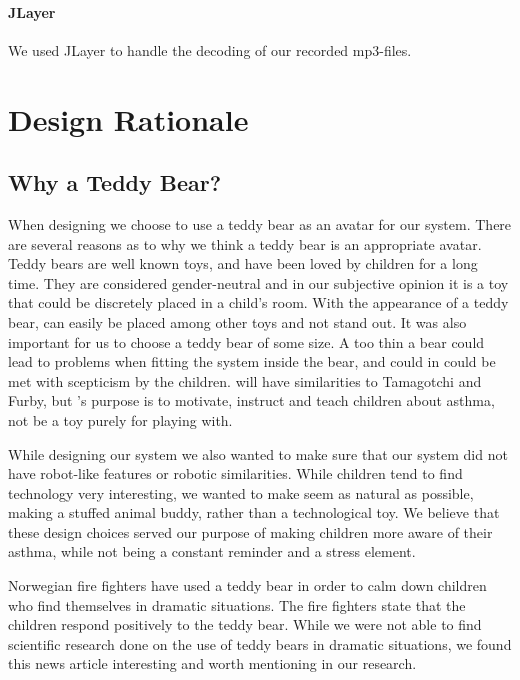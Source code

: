 \paragraph{JLayer}
We used JLayer to handle the decoding of our recorded mp3-files. 

\section{Design Rationale}
\subsection{Why a Teddy Bear?}
When designing \buddy{} we choose to use a teddy bear as an avatar for our system. There are several reasons as to why we think a teddy bear is an appropriate avatar. Teddy bears are well known toys, and have been loved by children for a long time. They are considered gender-neutral\cite{stagnitti1997determining}\cite{cherney2006gender} and in our subjective opinion it is a toy that could be discretely placed in a child's room. With the appearance of a teddy bear, \buddy{} can easily be placed among other toys and not stand out. It was also important for us to choose a teddy bear of some size. A too thin a bear could lead to problems when fitting the system inside the bear, and could in could be met with scepticism by the children. \buddy{} will have similarities to Tamagotchi\cite{tamagotchi} and Furby\cite{furby}, but \buddy{}'s purpose is to motivate, instruct and teach children about asthma, not be a toy purely for playing with. 

While designing our system we also wanted to make sure that our system did not have robot-like features or robotic similarities. While children tend to find technology very interesting, we wanted to make \buddy{} seem as natural as possible, making a stuffed animal buddy, rather than a technological toy. We believe that these design choices served our purpose of making children more aware of their asthma, while not being a constant reminder and a stress element. 

Norwegian fire fighters have used a teddy bear in order to calm down children who find themselves in dramatic situations. The fire fighters state that the children respond positively to the teddy bear. 
While we were not able to find scientific research done on the use of teddy bears in dramatic situations, we found this news article interesting and worth mentioning in our research. 

